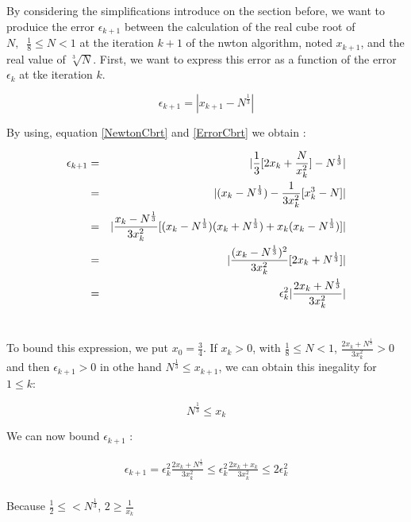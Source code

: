 \documentclass[12pt]{amsart}
\begin{document}
By considering the simplifications introduce on the section before, we
want to produice the error $\epsilon_{k+1}$ between the calculation of the real cube
root of $N, \;\; \frac{1}{8}\leq N < 1$ at the iteration $k+1$ of the
nwton algorithm, noted $x_{k+1}$, and the real value of
$\sqrt[3]{N}$. First, we want to express this error as a function of
the error $\epsilon_{k}$ at tke iteration $k$.

\begin{equation}\label{ErrorCbrt}
\epsilon_{k+1}= |x_{k+1}-N^{\frac{1}{3}}|
\end{equation}

By using, equation \ref{NewtonCbrt} and \ref{ErrorCbrt} we obtain :

\begin{eqnarray}\nonumber
\epsilon_{k+1}&=&   \arrowvert\frac{1}{3}[2x_k+\frac{N}{x^2_k}]-N^{\frac{1}{3}} \arrowvert\\\nonumber
  &=& \arrowvert (x_k-N^{\frac{1}{3}})-\frac{1}{3x^2_k}[x^3_k-N] \arrowvert \\\nonumber
  &=& \arrowvert
  \frac{x_k-N^{\frac{1}{3}}}{3x^2_k}[(x_k-N^{\frac{1}{3}})(x_k+N^{\frac{1}{3}})+x_k(x_k-N^{\frac{1}{3}})] \arrowvert\\\nonumber
  &=&\arrowvert \frac{(x_k-N^{\frac{1}{3}})^2}{3x^2_k}
  [2x_k+N^{\frac{1}{3}}]\arrowvert\\\nonumber
  &=&  \epsilon^2_{k}\arrowvert \frac{2x_k+N^{\frac{1}{3}}}{3x^2_k}\arrowvert\\\nonumber
\end{eqnarray}

To bound this expression, we put $x_0=\frac{3}{4}$. If $x_k >0 $, with
$\frac{1}{8}\leq N <1$, $\frac{2x_k+N^{\frac{1}{3}}}{3x^2_k} >0 $ and
then $\epsilon_{k+1} >0$ in othe hand $ N^{\frac{1}{3}}\leq x_{k+1}$,
we can obtain this inegality for $1 \leq k$:

\begin{equation}
N^{\frac{1}{3}}\leq x_{k}
\end{equation}


We can now bound $\epsilon_{k+1}$ :

\begin{eqnarray}\nonumber
\epsilon_{k+1} =  \epsilon^2_{k}
\frac{2x_k+N^{\frac{1}{3}}}{3x^2_k} \leq
\epsilon^2_{k}\frac{2x_k+x_k}{3x^2_k}\leq 2 \epsilon^2_{k}\\\nonumber
\end{eqnarray}

Because $\frac{1}{2}\leq<N^{\frac{1}{3}}$, $2\geq\frac{1}{x_k}$
\end{document}
